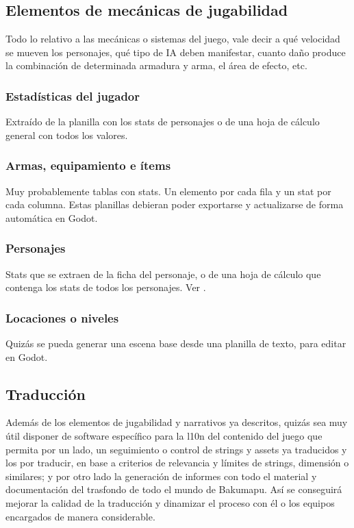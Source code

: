 \subsection{Elementos de mecánicas de jugabilidad}\label{kit:elementos-de-mecanicas}
Todo lo relativo a las mecánicas o sistemas del juego, vale decir a qué velocidad se mueven los personajes, qué tipo de IA deben manifestar, cuanto daño produce la combinación de determinada armadura y arma, el área de efecto, etc.

\subsubsection{Estadísticas del jugador}\label{kit:estadisticas-del-jugador}
Extraído de la planilla con los stats de personajes o de una hoja de cálculo general con todos los valores.

\subsubsection{Armas, equipamiento e ítems}\label{kit:armas-equipamiento-items}
Muy probablemente tablas con stats. Un elemento por cada fila y un stat por cada columna. Estas planillas debieran poder exportarse y actualizarse de forma automática en Godot.

\subsubsection{Personajes}\label{kit:personajes}
Stats que se extraen de la ficha del personaje, o de una hoja de cálculo que contenga los stats de todos los personajes. Ver .

\subsubsection{Locaciones o niveles}\label{kit:locaciones-o-niveles}
Quizás se pueda generar una escena base desde una planilla de texto, para editar en Godot.

\subsection{Traducción}\label{kit:traduccion}
Además de los elementos de jugabilidad y narrativos ya descritos, quizás sea muy útil disponer de software específico para la l10n del contenido del juego que permita por un lado, un seguimiento o control de strings y assets ya traducidos y los por traducir, en base a criterios de relevancia y límites de strings, dimensión o similares; y por otro lado la generación de informes con todo el material y documentación del trasfondo de todo el mundo de Bakumapu. Así se conseguirá mejorar la calidad de la traducción y dinamizar el proceso con él o los equipos encargados de manera considerable.

